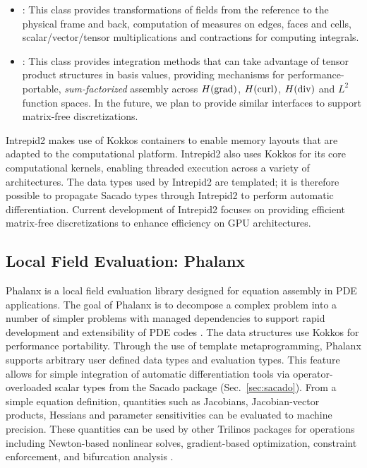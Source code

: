 \begin{itemize}
\item {}: This class provides transformations of fields from the reference to the physical frame and back, computation of measures on edges, faces and cells, scalar/vector/tensor multiplications and contractions for computing integrals.
\item {}: This class provides integration methods that can take advantage of tensor product structures in basis values, providing mechanisms for performance-portable, \emph{sum-factorized} assembly across $H({\rm grad})$, $H({\rm curl})$, $H({\rm div})$ and $L^2$ function spaces.  In the future, we plan to provide similar interfaces to support matrix-free discretizations.
\end{itemize}
Intrepid2 makes use of Kokkos containers to enable memory layouts that are adapted to the computational platform. Intrepid2 also uses Kokkos for its core computational kernels, enabling threaded execution across a variety of architectures. The data types used by Intrepid2 are templated; it is therefore possible to propagate Sacado types through Intrepid2 to perform automatic differentiation. Current development of Intrepid2 focuses on providing efficient matrix-free discretizations to enhance efficiency on GPU architectures. 

\subsection{Local Field Evaluation: Phalanx}
Phalanx is a local field evaluation library designed for equation assembly in PDE applications. The goal of Phalanx is to decompose a complex problem into a number of simpler problems with managed dependencies to support rapid development and extensibility of PDE codes \cite{Notz2012,pawlowski2012automating,pawlowski2012automatingpart2}. The data structures use Kokkos for performance portability. Through the use of template metaprogramming, Phalanx supports arbitrary user defined data types and evaluation types. This feature allows for simple integration of automatic differentiation tools via operator-overloaded scalar types from the Sacado package (Sec.~\ref{sec:sacado}). From a simple equation definition, quantities such as Jacobians, Jacobian-vector products, Hessians and parameter sensitivities can be evaluated to machine precision. These quantities can be used by other Trilinos packages for operations including Newton-based nonlinear solves, gradient-based optimization, constraint enforcement, and bifurcation analysis \cite{pawlowski2012automating,pawlowski2012automatingpart2}.

